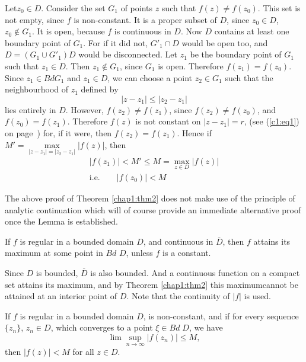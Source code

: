 \medskip
{}
Let\pageoriginale $z_0 \in D$. Consider the set $G_1$ of points $z$
such that $f(z) \neq f (z_0)$. This set is not empty, since $f$ is
non-constant. It is a proper subset of $D$, since $z_0 \in D$, $z_0
\notin G_1$. It is open, because $f$ is continuous in $D$. Now $D$
contains at least one boundary point of $G_1$. For if it did not,
$G'_1\cap D$ would be open too, and $D = (G_1 \cup G'_1)D$ would be
disconnected. Let $z_1$  be the boundary point of $G_1$ such that
$z_1 \in D$. Then $z_1 \notin G_1$, since $G_1$ is open. Therefore
$f(z_1) = f(z_0)$. Since $z_1 \in Bd G_1$ and $z_1 \in D$, we can
choose a point $z_2 \in G_1$ such that the neighbourhood of $z_1$
defined by
$$
|z-z_1| \leq |z_2 - z_1|
$$
lies entirely in $D$. However, $f(z_2) \neq f (z_1)$, since $f(z_2)
\neq f(z_0)$, and $f(z_0) = f(z_1)$. Therefore $f(z)$ is not constant
on $|z-z_1| = r$, (see (\ref{c1:eq1}) on page~\pageref{c1:eq1}) for, if it were, then $f(z_2) =
f(z_1)$. Hence if $M' = \max\limits_{|z-z_1| = |z_2-z_1|} |f(z)|$,
then 
\begin{gather*}
|f(z_1)| < M' \leq M = \max\limits_{z\in  D} |f(z)|\\
\text{i.e.} \qquad  |f(z_0)| < M\qquad 
\end{gather*}

\begin{remarks*}
The above proof of Theorem \ref{chap1:thm2} \cite[Bd I, p.134]{key7} does not make use of the
principle of analytic continuation which will of course provide an
immediate alternative proof once the Lemma is established.
\end{remarks*}

\begin{thm}\label{chap1:thm3}
If $f$ is regular in a bounded domain $D$, and continuous in
$\overline{D}$, then $f$ attains its maximum at some point in $Bd$ $D$,
unless $f$ is a constant.

Since $D$ is bounded, $\overline{D}$ is also bounded. And a continuous
function on a compact set attains its maximum, and by Theorem \ref{chap1:thm2} this
maximum\pageoriginale cannot be attained at an interior point of
$D$. Note that the continuity of $|f|$ is used.
\end{thm}

\begin{thm}\label{chap1:thm4}
If $f$ is regular in a bounded domain $D$, is non-constant, and if for
every sequence $\{z_n\}$, $z_n \in D$, which converges to a point
$\xi \in Bd \; D$, we have 
$$
\lim\sup\limits_{n \to \infty}  |f(z_n)| \leq M,
$$
then $|f(z)| < M$ for all $z\in D$. \cite[p.111]{key17}
\end{thm}

